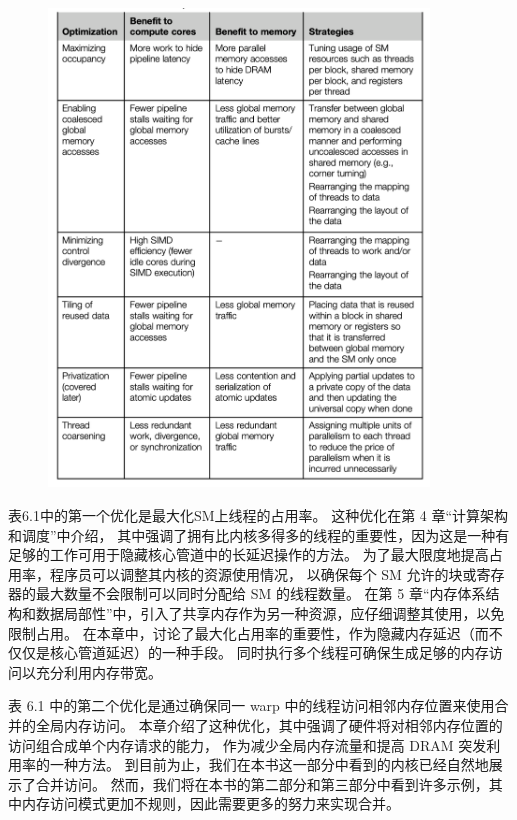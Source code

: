 \begin{figure}[H]
	\centering
	\includegraphics[width=0.9\textwidth]{figs/F6-a.2.png}
\end{figure}

表6.1中的第一个优化是最大化SM上线程的占用率。 这种优化在第 4 章“计算架构和调度”中介绍，
其中强调了拥有比内核多得多的线程的重要性，因为这是一种有足够的工作可用于隐藏核心管道中的长延迟操作的方法。 
为了最大限度地提高占用率，程序员可以调整其内核的资源使用情况，
以确保每个 SM 允许的块或寄存器的最大数量不会限制可以同时分配给 SM 的线程数量。 
在第 5 章“内存体系结构和数据局部性”中，引入了共享内存作为另一种资源，应仔细调整其使用，以免限制占用。 
在本章中，讨论了最大化占用率的重要性，作为隐藏内存延迟（而不仅仅是核心管道延迟）的一种手段。 
同时执行多个线程可确保生成足够的内存访问以充分利用内存带宽。

表 6.1 中的第二个优化是通过确保同一 warp 中的线程访问相邻内存位置来使用合并的全局内存访问。 
本章介绍了这种优化，其中强调了硬件将对相邻内存位置的访问组合成单个内存请求的能力，
作为减少全局内存流量和提高 DRAM 突发利用率的一种方法。 
到目前为止，我们在本书这一部分中看到的内核已经自然地展示了合并访问。 
然而，我们将在本书的第二部分和第三部分中看到许多示例，其中内存访问模式更加不规则，因此需要更多的努力来实现合并。


